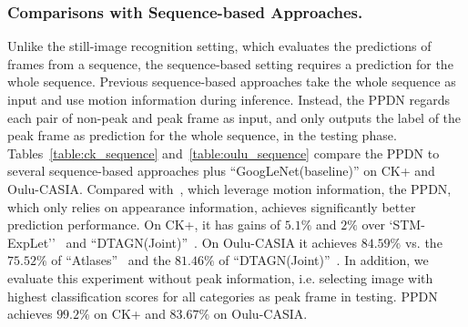 \documentclass[runningheads]{llncs}
\begin{document}
\subsubsection{Comparisons with Sequence-based Approaches.} Unlike the 
still-image recognition setting, which evaluates the predictions of frames 
from a sequence, the sequence-based setting requires a prediction for the
whole sequence. Previous sequence-based approaches take the whole sequence 
as input and use motion information during inference. Instead, the PPDN 
regards each pair of non-peak and peak frame as input, and only outputs
the label of the peak frame as prediction for the whole sequence, in the 
testing phase. %
Tables~\ref{table:ck_sequence} and~\ref{table:oulu_sequence} compare
the PPDN to several sequence-based approaches plus ``GoogLeNet(baseline)'' 
on CK+ and Oulu-CASIA. Compared with~\cite{liu2014learning,liu2014deeply,jung2015joint}, which leverage motion information, the PPDN, which only relies on  
appearance information, achieves significantly better prediction performance.
On CK+, it has gains of $5.1\%$ and $2\%$ over 
`STM-ExpLet''~\cite{liu2014learning} and 
``DTAGN(Joint)''~\cite{jung2015joint}. On Oulu-CASIA it achieves
$84.59\%$ vs. the $75.52\%$ of ``Atlases''~\cite{guo2012dynamic} and 
the $81.46\%$ of ``DTAGN(Joint)''~\cite{jung2015joint}. In addition, we evaluate this experiment without peak information, i.e. selecting image with highest classification scores for all categories as peak frame in testing. PPDN achieves $99.2\%$ on CK+ and $83.67\%$ on Oulu-CASIA.

\end{document}
